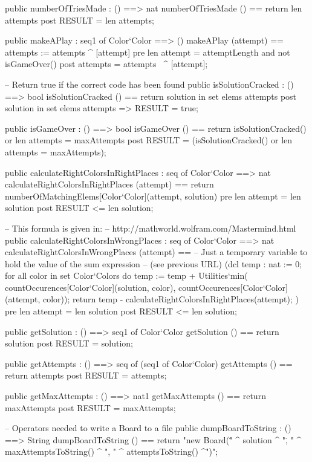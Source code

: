 \begin{vdm_al}
  public numberOfTriesMade : () ==> nat
   numberOfTriesMade () == return len attempts
  post RESULT = len attempts;


  public makeAPlay : seq1 of Color`Color ==> ()
   makeAPlay (attempt) == attempts := attempts ^ [attempt]
  pre len attempt = attemptLength and
   not isGameOver()
  post attempts = attempts~ ^ [attempt];


  -- Return true if the correct code has been found
  public isSolutionCracked : () ==> bool
   isSolutionCracked () == return solution in set elems attempts
  post solution in set elems attempts => RESULT = true;


  public isGameOver : () ==> bool
   isGameOver () == return isSolutionCracked() or len attempts = maxAttempts
  post RESULT = (isSolutionCracked() or len attempts = maxAttempts);


  public calculateRightColorsInRightPlaces : seq of Color`Color ==> nat
   calculateRightColorsInRightPlaces (attempt) ==
    return numberOfMatchingElems[Color`Color](attempt, solution)
  pre len attempt = len solution
  post RESULT <= len solution;


  -- This formula is given in:
  -- http://mathworld.wolfram.com/Mastermind.html
  public calculateRightColorsInWrongPlaces : seq of Color`Color ==> nat
   calculateRightColorsInWrongPlaces (attempt) ==
   -- Just a temporary variable to hold the value of the sum expression
   -- (see previous URL)
    (dcl temp : nat := 0;
     for all color in set Color`Colors do
      temp := temp +
       Utilities`min(
        countOccurences[Color`Color](solution, color),
        countOccurences[Color`Color](attempt, color));
     return temp - calculateRightColorsInRightPlaces(attempt);
    )
  pre len attempt = len solution
  post RESULT <= len solution;


  public getSolution : () ==> seq1 of Color`Color
   getSolution () == return solution
  post RESULT = solution;


  public getAttempts : () ==> seq of (seq1 of Color`Color)
   getAttempts () == return attempts
  post RESULT = attempts;


  public getMaxAttempts : () ==> nat1
   getMaxAttempts () == return maxAttempts
  post RESULT = maxAttempts;



  -- Operators needed to write a Board to a file
  public dumpBoardToString : () ==> String
  dumpBoardToString () ==
   return "new Board(\"" ^ solution ^ "\", " ^ maxAttemptsToString()
    ^ ", " ^ attemptsToString() ^")";


\end{vdm_al}
